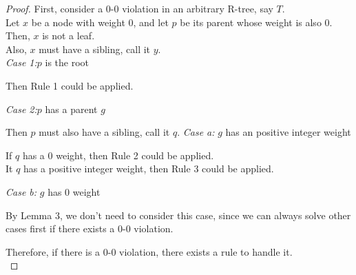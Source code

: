\documentclass[10pt]{article}
\begin{document}
\begin{enumerate}
	\begin{proof}
	First, consider a 0-0 violation in an arbitrary R-tree, say $T$. \\
	Let $x$ be a node with weight 0, and let $p$ be its parent whose weight is also 0. \\
	Then, $x$ is not a leaf. \\
	Also, $x$ must have a sibling, call it $y$. \\
	\textit{Case 1:}$p$ is the root
	\begin{addmargin}[1em]{0em}
		Then Rule 1 could be applied.
	\end{addmargin}
	\textit{Case 2:}$p$ has a parent $g$
	\begin{addmargin}[1em]{0em}
		Then $p$ must also have a sibling, call it $q$. 
		\textit{Case a:} $g$ has an positive integer weight
		\begin{addmargin}[1em]{0em}
			If $q$ has a 0 weight, then Rule 2 could be applied. \\
			It $q$ has a positive integer weight, then Rule 3 could be applied.
		\end{addmargin}
		\textit{Case b:} $g$ has 0 weight
		\begin{addmargin}[1em]{0em}
			By Lemma 3, we don't need to consider this case, since we can
			always solve other cases first if there exists a 0-0 violation.
		\end{addmargin}
	\end{addmargin}
	Therefore, if there is a 0-0 violation, there exists a rule to handle it.\\


\end{proof}
\end{enumerate}
\end{document}
